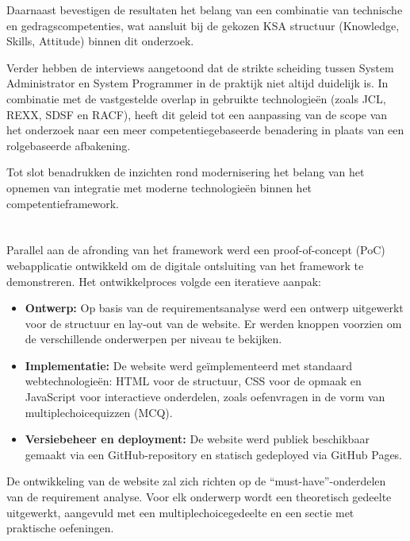Daarnaast bevestigen de resultaten het belang van een combinatie van technische en gedragscompetenties, wat aansluit bij de gekozen KSA structuur (Knowledge, Skills, Attitude) binnen dit onderzoek.

Verder hebben de interviews aangetoond dat de strikte scheiding tussen System Administrator en System Programmer in de praktijk niet altijd duidelijk is. In combinatie met de vastgestelde overlap in gebruikte technologieën (zoals JCL, REXX, SDSF en RACF), heeft dit geleid tot een aanpassing van de scope van het onderzoek naar een meer competentiegebaseerde benadering in plaats van een rolgebaseerde afbakening.

Tot slot benadrukken de inzichten rond modernisering het belang van het opnemen van integratie met moderne technologieën binnen het competentieframework.

\section{}%
\label{sec:poc-ontwikkeling}

Parallel aan de afronding van het framework werd een proof-of-concept (PoC) webapplicatie ontwikkeld om de digitale ontsluiting van het framework te demonstreren. Het ontwikkelproces volgde een iteratieve aanpak:

\begin{itemize}
	\item \textbf{Ontwerp:} Op basis van de requirementsanalyse werd een ontwerp uitgewerkt voor de structuur en lay-out van de website. Er werden knoppen voorzien om de verschillende onderwerpen per niveau te bekijken. 
	\item \textbf{Implementatie:} De website werd geïmplementeerd met standaard webtechnologieën: HTML voor de structuur, CSS voor de opmaak en JavaScript voor interactieve onderdelen, zoals oefenvragen in de vorm van multiplechoicequizzen (MCQ).
	\item \textbf{Versiebeheer en deployment:} De website werd publiek beschikbaar gemaakt via een GitHub-repository en statisch gedeployed via GitHub Pages.
\end{itemize}
De ontwikkeling van de website zal zich richten op de “must-have”-onderdelen van de requirement analyse. Voor elk onderwerp wordt een theoretisch gedeelte uitgewerkt, aangevuld met een multiplechoicegedeelte en een sectie met praktische oefeningen.

